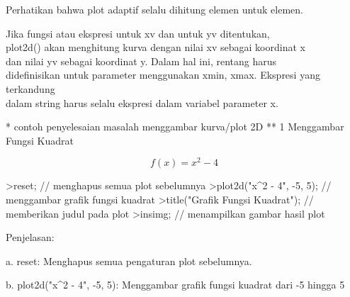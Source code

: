\documentclass{article}
\begin{document}
\begin{eulernotebook}
\begin{eulercomment}
\begin{eulercomment}
\begin{eulercomment}
\begin{eulercomment}
\begin{eulercomment}
\begin{eulercomment}
\begin{eulercomment}
\begin{eulercomment}
\begin{eulercomment}
\begin{eulercomment}
\begin{eulercomment}
\begin{eulercomment}
\begin{eulercomment}
\begin{eulercomment}
\begin{eulercomment}
\begin{eulercomment}
\begin{eulercomment}
\begin{eulercomment}
\begin{eulercomment}
\begin{eulercomment}
\begin{eulercomment}
\begin{eulercomment}
\begin{eulercomment}
\begin{eulercomment}
\begin{eulercomment}
\begin{eulercomment}
\begin{eulercomment}
\begin{eulercomment}
\begin{eulercomment}
\end{eulercomment}
\begin{eulerttcomment}
 Perhatikan bahwa plot adaptif selalu dihitung elemen untuk elemen.
\end{eulerttcomment}
\begin{eulercomment}
Jika fungsi atau ekspresi untuk xv dan untuk yv ditentukan,\\
plot2d() akan menghitung kurva dengan nilai xv sebagai koordinat x\\
dan nilai yv sebagai koordinat y. Dalam hal ini, rentang harus\\
didefinisikan untuk parameter menggunakan xmin, xmax. Ekspresi yang
terkandung\\
dalam string harus selalu ekspresi dalam variabel parameter x.

\end{eulercomment}
\eulersubheading{}
\begin{eulercomment}
* contoh penyelesaian masalah menggambar kurva/plot 2D ** 1 Menggambar
Fungsi Kuadrat

\end{eulercomment}
\begin{eulerformula}
\[
f(x)=x^2-4
\]
\end{eulerformula}
\begin{eulerprompt}
>reset; // menghapus semua plot sebelumnya
>plot2d("x^2 - 4", -5, 5); // menggambar grafik fungsi kuadrat
>title("Grafik Fungsi Kuadrat"); // memberikan judul pada plot
>insimg; // menampilkan gambar hasil plot
\end{eulerprompt}
\begin{eulercomment}
Penjelasan:

a. reset: Menghapus semua pengaturan plot sebelumnya.

b. plot2d("x\textasciicircum{}2 - 4", -5, 5): Menggambar grafik fungsi kuadrat dari -5
hingga 5


\end{eulercomment}
\end{eulercomment}
\end{eulercomment}
\end{eulercomment}
\end{eulercomment}
\end{eulercomment}
\end{eulercomment}
\end{eulercomment}
\end{eulercomment}
\end{eulercomment}
\end{eulercomment}
\end{eulercomment}
\end{eulercomment}
\end{eulercomment}
\end{eulercomment}
\end{eulercomment}
\end{eulercomment}
\end{eulercomment}
\end{eulercomment}
\end{eulercomment}
\end{eulercomment}
\end{eulercomment}
\end{eulercomment}
\end{eulercomment}
\end{eulercomment}
\end{eulercomment}
\end{eulercomment}
\end{eulercomment}
\end{eulercomment}
\end{eulernotebook}
\end{document}
